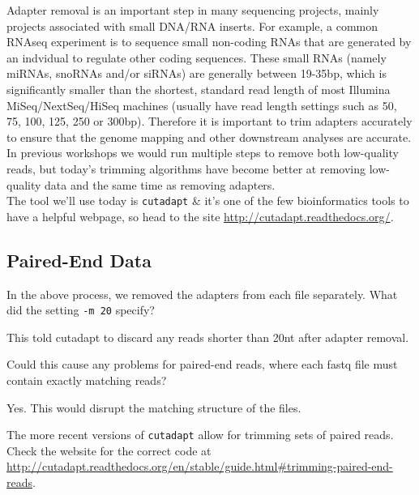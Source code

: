 Adapter removal is an important step in many sequencing projects, mainly projects associated with small DNA/RNA inserts. For example, a common RNAseq experiment is to sequence small non-coding RNAs that are generated by an indvidual to regulate other coding sequences. These small RNAs (namely miRNAs, snoRNAs and/or siRNAs) are generally between 19-35bp, which is significantly smaller than the shortest, standard read length of most Illumina MiSeq/NextSeq/HiSeq machines (usually have read length settings such as 50, 75, 100, 125, 250 or 300bp). Therefore it is important to trim adapters accurately to ensure that the genome mapping and other downstream analyses are accurate.
In previous workshops we would run multiple steps to remove both low-quality reads, but today's trimming algorithms have become better at removing low-quality data and the same time as removing adapters. \\

The tool we'll use today is \texttt{cutadapt} \& it's one of the few bioinformatics tools to have a helpful webpage, so head to the site \url{http://cutadapt.readthedocs.org/}.


\subsection{Paired-End Data}
\begin{advanced}
\begin{questions}
In the above process, we removed the adapters from each file separately.
What did the setting \texttt{-m 20} specify?\\
\begin{answer}
This told cutadapt to discard any reads shorter than 20nt after adapter removal.
\end{answer}
Could this cause any problems for paired-end reads, where each fastq file must contain exactly matching reads?\\
\begin{answer}
Yes. This would disrupt the matching structure of the files.
\end{answer}
\end{questions}

The more recent versions of \texttt{cutadapt} allow for trimming sets of paired reads.
Check the website for the correct code at \url{http://cutadapt.readthedocs.org/en/stable/guide.html#trimming-paired-end-reads}.
\end{advanced}

